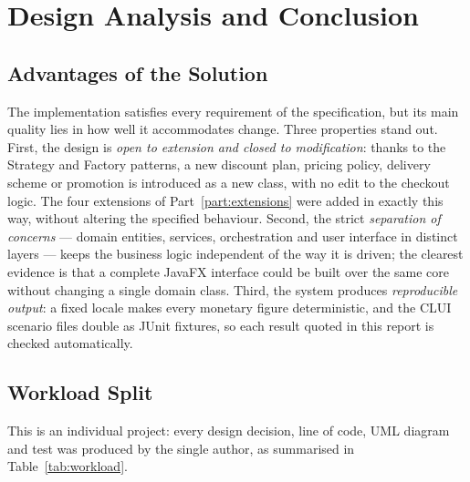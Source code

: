\chapter{Design Analysis and Conclusion}
\label{ch:conclusion}

\section{Advantages of the Solution}
The implementation satisfies every requirement of the specification, but its
main quality lies in how well it accommodates change. Three properties stand
out. First, the design is \emph{open to extension and closed to modification}:
thanks to the Strategy and Factory patterns, a new discount plan, pricing
policy, delivery scheme or promotion is introduced as a new class, with no edit
to the checkout logic. The four extensions of Part~\ref{part:extensions} were
added in exactly this way, without altering the specified behaviour. Second, the
strict \emph{separation of concerns} --- domain entities, services,
orchestration and user interface in distinct layers --- keeps the business logic
independent of the way it is driven; the clearest evidence is that a complete
JavaFX interface could be built over the same core without changing a single
domain class. Third, the system produces \emph{reproducible output}: a fixed
locale makes every monetary figure deterministic, and the CLUI scenario files
double as JUnit fixtures, so each result quoted in this report is checked
automatically.

\section{Workload Split}
This is an individual project: every design decision, line of code, UML diagram
and test was produced by the single author, as summarised in
Table~\ref{tab:workload}.

